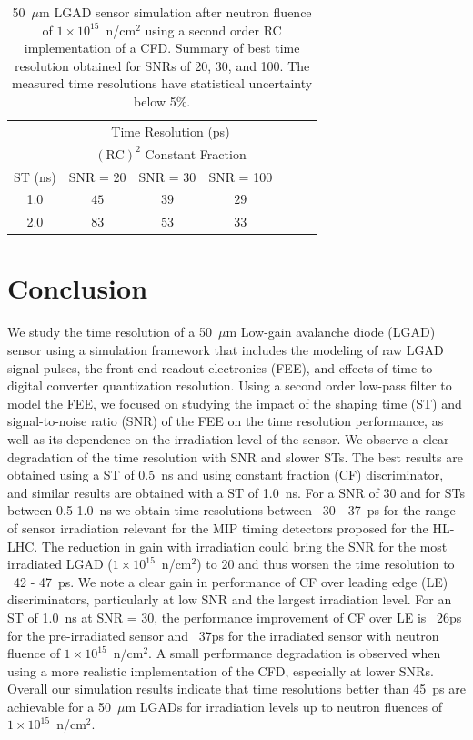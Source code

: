 \documentclass[preprint,1p]{elsarticle}
\begin{document}
 \begin{table}
    \begin{center}
     \begin{tabular}{c|ccc|ccc}
     \multicolumn{1}{c}{}& \multicolumn{3}{c}{Time Resolution (ps)} \\
     \multicolumn{1}{c}{}& \multicolumn{3}{c}{$\mathrm{(RC)}^{2}$ Constant Fraction}\\ \hline
     ST (ns) & SNR = 20      & SNR = 30      & SNR = 100 \\
     1.0 & $45$  & $ 39$  & $29$ \\
     2.0 & $83$  & $ 53$  & $33$ \\     
     \end{tabular}
     \end{center}
     \caption{50~$\mu$m LGAD sensor simulation after neutron fluence of
      $1\times 10^{15}$~n/cm$^2$ using a second order RC implementation of a CFD. 
      Summary of best time resolution obtained for SNRs
     of 20, 30, and 100. The measured time resolutions
    have statistical uncertainty below 5\%. }
\label{tab:shaping_time_1e15_psCFD}
  \end{table}
  
  
\section{Conclusion}\label{sec:conclusion}

We study the time resolution of a 50~$\mu$m Low-gain avalanche diode (LGAD) 
sensor using a simulation framework that includes the
modeling of raw LGAD signal pulses, the front-end readout electronics (FEE), and effects of 
time-to-digital converter quantization resolution.
Using a second order low-pass filter to model the FEE, 
we focused on studying the impact of the shaping time (ST) and signal-to-noise ratio (SNR) of the FEE 
on the time resolution performance, as well as its dependence on the irradiation level of the sensor. 
We observe a clear degradation of the time resolution with SNR and slower STs. The best results are
obtained using a ST of 0.5~\si{ns} and using constant fraction (CF) discriminator, and similar 
results are obtained with a ST of 1.0~\si{ns}. For a SNR of 30 and for STs between 0.5-1.0~\si{ns} we 
obtain time resolutions between ~30 - 37~\si{ps} for the range of sensor irradiation relevant for the MIP timing detectors
proposed for the HL-LHC. The reduction in gain with irradiation could bring the SNR for the most irradiated 
LGAD ($1\times 10^{15}$~n/cm$^2$) to 20 and thus worsen the time resolution to ~42 - 47~\si{ps}. 
We note a clear gain in performance of CF over leading edge (LE) discriminators, particularly at
low SNR and the largest irradiation level. For an ST of 1.0~\si{ns} at SNR = 30, the performance improvement of 
CF over LE is ~26\si{ps} for the pre-irradiated sensor and ~37\si{ps} for the irradiated sensor with neutron fluence of
$1\times 10^{15}$~n/cm$^2$. A small performance degradation is observed when using a more
realistic implementation of the CFD, especially at lower SNRs. Overall our simulation results indicate that 
time resolutions better than 45~\si{ps} are achievable for a 50~$\mu$m LGADs for irradiation levels up 
to neutron fluences of $1\times 10^{15}$~n/cm$^2$.
\end{document}
